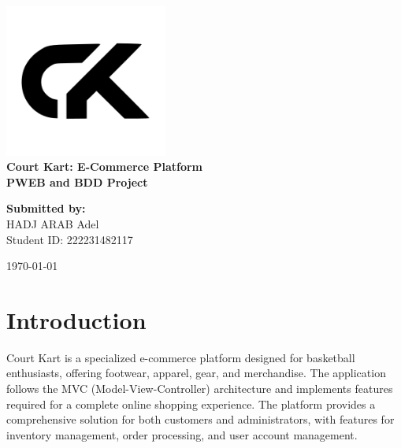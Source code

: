 \documentclass{article}
\begin{document}
\begin{titlepage}
	\centering
	\vspace*{1cm}

	\includegraphics[width=0.4\textwidth]{../public/assets/images/court-kart-logo.png}\\[1.5cm]

	\textbf{\LARGE Court Kart: E-Commerce Platform}\\[0.5cm]
	\textbf{\Large PWEB and BDD Project}\\[2cm]

	\begin{minipage}{0.45\textwidth}
		\begin{flushleft}
			\large
			\textbf{Submitted by:}\\
			HADJ ARAB Adel\\
			Student ID: 222231482117\\
		\end{flushleft}
	\end{minipage}

	\vfill

	{\large \today}

\end{titlepage}

\newpage
\tableofcontents
\newpage

\section{Introduction}

Court Kart is a specialized e-commerce platform designed for basketball enthusiasts, offering footwear, apparel, gear, and merchandise. The application follows the MVC (Model-View-Controller) architecture and implements features required for a complete online shopping experience. The platform provides a comprehensive solution for both customers and administrators, with features for inventory management, order processing, and user account management.
\end{document}
